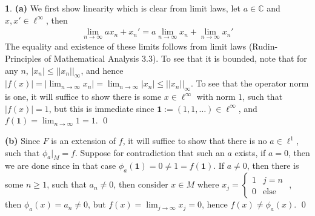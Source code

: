 \documentclass[11pt]{article}
\theoremstyle{definition}
\newtheorem{pb}{}
\newcommand{\abs}[1]{\left\vert#1\right\vert}
\newcommand{\norm}[1]{\lvert\lvert#1\rvert\rvert}
\begin{document}
    \begin{pb}
        \textbf{(a)} We first show linearity which is clear from limit laws, let \(a \in \mathbb{C}\) and \(x, x' \in \ell^\infty\), then 
        \begin{align*}
            \lim_{n\to \infty}ax_n + x_n' = a\lim_{n \to \infty}x_n + \lim_{n\to\infty}x_n'
        \end{align*}
        The equality and existence of these limits follows from limit laws (Rudin- Principles of Mathematical Analysis 3.3). To see that it is bounded, note that for any \(n\), \(\abs{x_n} \leq \norm{x_n}_\infty\), and hence \(\abs{f(x)} = \abs{\lim_{n\to\infty} x_n} = \lim_{n\to \infty} \abs{x_n} \leq \norm{x_n}_\infty\). To see that the operator norm is one, it will suffice to show there is some \(x \in \ell^\infty\) with norm \(1\), such that \(\abs{f(x)} = 1\), but this is immediate since \(\mathbf{1} := (1,1,\hdots) \in \ell^\infty\), and \(f(\mathbf{1}) = \lim_{n \to \infty} 1 = 1\). \qed

        \textbf{(b)} Since \(F\) is an extension of \(f\), it will suffice to show that there is no \(a \in \ell^1\), such that \(\phi_a\vert_M = f\). Suppose for contradiction that such an \(a\) exists, if \(a = 0\), then we are done since in that case \(\phi_a(\mathbf{1}) = 0 \neq 1 = f(\mathbf{1})\). If \(a \neq 0\), then there is some \(n \geq 1\), such that \(a_n \neq 0\), then consider \(x \in M\) where \(x_j = \begin{cases}
            1 & j = n \\
            0 & \text{else}
        \end{cases}\) , then \(\phi_a(x) = a_n \neq 0\), but \(f(x) = \lim_{j \to \infty}x_j = 0\), hence \(f(x) \neq \phi_a(x)\). \qed
    \end{pb}
\end{document}
